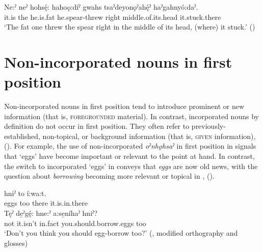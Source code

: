 \ex \label{ex:nounincdiscexb} 
 \gll Ne:ˀ neˀ hohsę́: hahoǫ:díˀ gwahs tsaˀdeyonǫˀahę́ˀ haˀgahnyó:daˀ.\\
it.is the he.is.fat he.spear-threw right middle.of.its.head it.stuck.there\\
\glt ‘The fat one threw the spear right in the middle of its head, (where) it stuck.’ (\cite{keye_hnyagwaidatgigowah_2012})

\z
\z 


\section{Non-incorporated nouns in first position} \label{ch:Non-incorporated nouns in first position}
Non-incorporated nouns in first position tend to introduce prominent or new information (that is, \textsc{foregrounded} material). In contrast, incorporated nouns by definition do not occur in first position. They often refer to previously-established, non-topical, or background information (that is, \textsc{given} information), (\cite[406]{mithun_morphological_1995}). For example, the use of non-incorporated \textit{oˀnhǫhsaˀ} in first position in  signals that ‘eggs’ have become important or relevant to the point at hand. In contrast, the switch to incorporated  ‘eggs’ in  conveys that \emph{eggs} are now old news, with the question about \emph{borrowing} becoming more relevant or topical in , (\cite[429]{mithun_languages_1999}).

\ea\label{ex:nounincdiscex30}
\ea\label{ex:nounincdiscex30a} 
\gll {} hniˀ to í:wa:t.\\
eggs too there it.is.in.there\\
\glt {}
\ex \label{ex:nounincdiscex30b}
\gll Tęˀ de̱ˀgę́: hne:ˀ a:se̱níhaˀ hniˀ?\\
not it.isn’t in.fact you.should.borrow.eggs too \\
\glt ‘Don't you think you should egg-borrow too?’ (\cite[429]{mithun_languages_1999}, modified orthography and glosses)
\z
\z 

